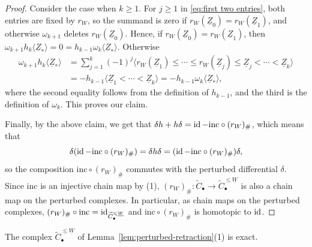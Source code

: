 \documentclass[a4paper,leqno]{amsart}
\begin{document}
\begin{proof}
Consider the case when $k\geq1$. 
For $j\geq1$ in \eqref{eq:first two entries}, both entries are fixed by $r_W$, so the summand is zero if $r_W(\underline{Z}_0)=r_W(\underline{Z}_1)$, and otherwise $\omega_{k+1}$ deletes $r_W(\underline{Z}_0)$. Hence, if $r_W(\underline{Z}_0)=r_W(\underline{Z}_1)$, then $\omega_{k+1}h_k\langle\underline{Z}_\ast\rangle=0=h_{k-1}\omega_k\langle\underline{Z}_\ast\rangle$. Otherwise
\begin{align*}
 \omega_{k+1}h_k\langle\underline{Z}_\ast\rangle
 &=\sum_{j=1}^k(-1)^{j}
 \langle r_W(\underline{Z}_1)\leq\cdots\leq r_W(\underline{Z}_{j})\leq\underline{Z}_{j}<\cdots<\underline{Z}_k\rangle\\
 &=-h_{k-1}\langle\underline{Z}_1<\cdots<\underline{Z}_k\rangle
 =-h_{k-1}\omega_k\langle\underline{Z}_\ast\rangle,
\end{align*}
where the second equality follows from the definition of $h_{k-1}$, and the third is the definition of $\omega_k$.  This proves our claim.

Finally, by the above claim, we get that $\delta h+h\delta=\operatorname{id}-\mathrm{inc}\circ(r_W)_\#$, which means that
\[\delta(\operatorname{id}-\mathrm{inc}\circ(r_W)_\#)=\delta h\delta=(\operatorname{id}-\mathrm{inc}\circ(r_W)_\#)\delta,\] so the composition $\mathrm{inc}\circ (r_W)_\#$ commutes with the perturbed differential $\delta$. 
Since $\mathrm{inc}$ is an injective chain map by (1), $(r_W)_\# : \widetilde{C}_\bullet \to \widetilde{C}_\bullet^{\le \underline{W}}$ is also a chain map on the perturbed complexes. 
In particular, as chain maps on the perturbed complexes, $(r_W)_\#\circ\mathrm{inc}=\operatorname{id}_{\widetilde{C}_\bullet^{\leqslant\underline{W}}}$ and $\mathrm{inc}\circ(r_W)_\#$ is homotopic to $\operatorname{id}$.
\end{proof}


\begin{lem}\label{lem:perturbed-lower-exact}
The complex $\widetilde{C}^{\leq\underline{W}}_\bullet$ of Lemma~\ref{lem:perturbed-retraction}\textup{(1)} is exact.
\end{lem}
\end{document}
